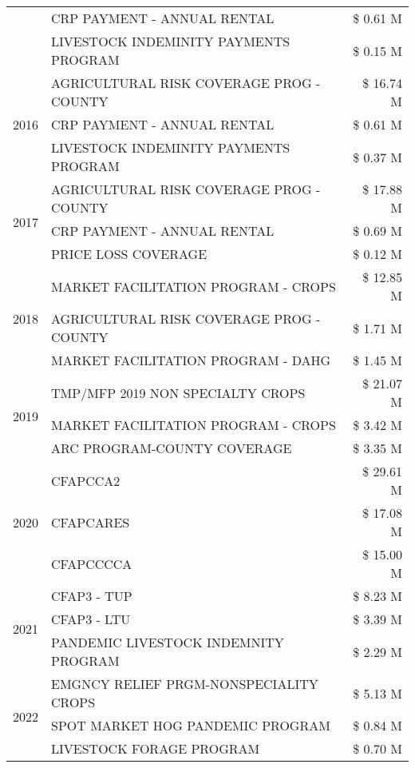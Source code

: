 \begin{tabular}{llr}
 & CRP PAYMENT - ANNUAL RENTAL & \$ 0.61 M \\
 & LIVESTOCK INDEMINITY PAYMENTS PROGRAM & \$ 0.15 M \\
\cline{1-3}
\multirow[t]{3}{*}{2016} & AGRICULTURAL RISK COVERAGE PROG - COUNTY & \$ 16.74 M \\
 & CRP PAYMENT - ANNUAL RENTAL & \$ 0.61 M \\
 & LIVESTOCK INDEMINITY PAYMENTS PROGRAM & \$ 0.37 M \\
\cline{1-3}
\multirow[t]{3}{*}{2017} & AGRICULTURAL RISK COVERAGE PROG - COUNTY & \$ 17.88 M \\
 & CRP PAYMENT - ANNUAL RENTAL & \$ 0.69 M \\
 & PRICE LOSS COVERAGE & \$ 0.12 M \\
\cline{1-3}
\multirow[t]{3}{*}{2018} & MARKET FACILITATION PROGRAM - CROPS & \$ 12.85 M \\
 & AGRICULTURAL RISK COVERAGE PROG - COUNTY & \$ 1.71 M \\
 & MARKET FACILITATION PROGRAM - DAHG & \$ 1.45 M \\
\cline{1-3}
\multirow[t]{3}{*}{2019} & TMP/MFP 2019 NON SPECIALTY CROPS & \$ 21.07 M \\
 & MARKET FACILITATION PROGRAM - CROPS & \$ 3.42 M \\
 & ARC PROGRAM-COUNTY COVERAGE & \$ 3.35 M \\
\cline{1-3}
\multirow[t]{3}{*}{2020} & CFAPCCA2 & \$ 29.61 M \\
 & CFAPCARES & \$ 17.08 M \\
 & CFAPCCCCA & \$ 15.00 M \\
\cline{1-3}
\multirow[t]{3}{*}{2021} & CFAP3 - TUP & \$ 8.23 M \\
 & CFAP3 - LTU & \$ 3.39 M \\
 & PANDEMIC LIVESTOCK INDEMNITY PROGRAM & \$ 2.29 M \\
\cline{1-3}
\multirow[t]{3}{*}{2022} & EMGNCY RELIEF PRGM-NONSPECIALITY CROPS & \$ 5.13 M \\
 & SPOT MARKET HOG PANDEMIC PROGRAM & \$ 0.84 M \\
 & LIVESTOCK FORAGE PROGRAM & \$ 0.70 M \\
\cline{1-3}
\bottomrule
\end{tabular}
